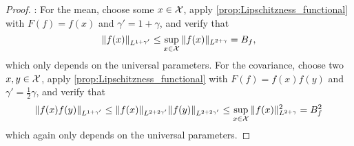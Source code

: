 \documentclass[12pt, twoside]{report}
\begin{document}
\begin{proof}
    :
    For the mean, choose some $x \in \mathcal{X}$, apply \cref{prop:Lipschitzness_functional} with $F(f) = f(x)$ and $\gamma' = 1 + \gamma$, and verify that
    \begin{equation}
        \lVert f(x)\rVert_{L^{1 + \gamma'}}
        \le \operatorname*{sup}_{x \in \mathcal{X}} \, \lVert f(x)\rVert_{L^{2 + \gamma}}
        = B_f,
    \end{equation}
    which only depends on the universal parameters.
    For the covariance, choose two $x, y \in \mathcal{X}$, apply \cref{prop:Lipschitzness_functional} with $F(f) = f(x)f(y)$ and $\gamma' = \frac12 \gamma$, and verify that 
    \begin{equation}
        \lVert f(x) f(y)\rVert_{L^{1 + \gamma'}}
        \le
            \lVert f(x)\rVert_{L^{2 + 2\gamma'}}
            \lVert f(y)\rVert_{L^{2 + 2\gamma'}}
        \le \operatorname*{sup}_{x \in \mathcal{X}}\, \lVert f(x)\rVert^2_{L^{2 + \gamma}}
        = B^2_f
    \end{equation}
    which again only depends on the universal parameters.
    

\end{proof}
\end{document}
